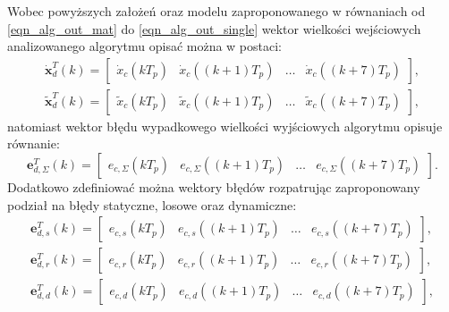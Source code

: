 Wobec powyższych założeń oraz modelu zaproponowanego w równaniach od \eqref{eqn_alg_out_mat} do \eqref{eqn_alg_out_single} wektor wielkości wejściowych analizowanego algorytmu opisać można w postaci:
\begin{gather}
\dot{\mathbf{x}}_{d}^{T} \left( k \right) =
\begin{bmatrix}
\dot{x}_{c} \left( kT_{p} \right) & \dot{x}_{c} \left( \left( k+1 \right) T_{p} \right) & \hdots & \dot{x}_{c} \left( \left( k+7 \right) T_{p} \right)
\end{bmatrix}
\label{eqn_sym_partd_input_ideal}, \\
\tilde{\mathbf{x}}_{d}^{T} \left( k \right) =
\begin{bmatrix}
\tilde{x}_{c} \left( kT_{p} \right) & \tilde{x}_{c} \left( \left( k+1 \right) T_{p} \right) & \hdots & \tilde{x}_{c} \left( \left( k+7 \right) T_{p} \right)
\end{bmatrix}
\label{eqn_sym_partd_input_real},
\end{gather}
natomiast wektor błędu wypadkowego wielkości wyjściowych algorytmu opisuje równanie:
\begin{equation}
\mathbf{e}_{d,\Sigma}^{T} \left( k \right) =
\begin{bmatrix}
e_{c,\Sigma} \left( kT_{p} \right) & e_{c,\Sigma} \left( \left( k+1 \right) T_{p} \right) & \hdots & e_{c,\Sigma} \left( \left( k+7 \right) T_{p} \right)
\end{bmatrix}
\label{eqn_sym_partd_input_error_sum}.
\end{equation}
Dodatkowo zdefiniować można wektory błędów rozpatrując zaproponowany podział na błędy statyczne, losowe oraz dynamiczne:
\begin{gather}
\mathbf{e}_{d,s}^{T} \left( k \right) =
\begin{bmatrix}
e_{c,s} \left( kT_{p} \right) & e_{c,s} \left( \left( k+1 \right) T_{p} \right) & \hdots & e_{c,s} \left( \left( k+7 \right) T_{p} \right)
\end{bmatrix}
\label{eqn_sym_partd_input_error_stat}, \\
\mathbf{e}_{d,r}^{T} \left( k \right) =
\begin{bmatrix}
e_{c,r} \left( kT_{p} \right) & e_{c,r} \left( \left( k+1 \right) T_{p} \right) & \hdots & e_{c,r} \left( \left( k+7 \right) T_{p} \right)
\end{bmatrix}
\label{eqn_sym_partd_input_error_rand}, \\
\mathbf{e}_{d,d}^{T} \left( k \right) =
\begin{bmatrix}
e_{c,d} \left( kT_{p} \right) & e_{c,d} \left( \left( k+1 \right) T_{p} \right) & \hdots & e_{c,d} \left( \left( k+7 \right) T_{p} \right)
\end{bmatrix}
\label{eqn_sym_partd_input_error_dyn},
\end{gather}
